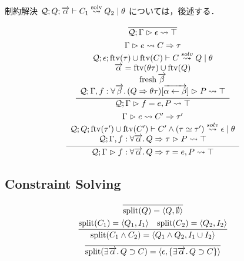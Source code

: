 制約解決 $\mathcal{Q}; Q; \overrightarrow{\alpha} \vdash C_1 \overset{\mathrm{solv}}{\rightsquigarrow} Q_2 \mid \theta$ については，後述する．

\begin{gather*}
  \infer{\mathcal{Q}; \Gamma \vrhd \epsilon \elab \top}{}
  \\
  \infer{\mathcal{Q}; \Gamma \vrhd f = e, P \elab \top}{
    \begin{array}{c}
      \Gamma \vrhd e \elab C \Rightarrow \tau \\
      \mathcal{Q}; \epsilon; \mathrm{ftv}(\tau) \cup \mathrm{ftv}(C) \vdash C \overset{solv}{\elab} Q \mid \theta \\
      \overrightarrow{\alpha} = \mathrm{ftv}(\theta\tau) \cup \mathrm{ftv}(Q) \\
      \symfresh \overrightarrow{\beta} \\
      \mathcal{Q}; \Gamma, f: \forall \overrightarrow{\beta}\ldotp (Q \Rightarrow \theta\tau)[\overrightarrow{\alpha \assign \beta}] \vrhd P \elab \top
    \end{array}
  }
  \\
  \infer{\mathcal{Q}; \Gamma \vrhd f: \forall \overrightarrow{\alpha}\ldotp Q \Rightarrow \tau = e, P \elab \top}{
    \begin{array}{c}
      \Gamma \vrhd e \elab C' \Rightarrow \tau' \\
      \mathcal{Q}; Q; \mathrm{ftv}(\tau') \cup \mathrm{ftv}(C') \vdash C' \land (\tau \simeq \tau') \overset{solv}{\elab} \epsilon \mid \theta \\
      \mathcal{Q}; \Gamma, f: \forall \overrightarrow{\alpha}\ldotp Q \Rightarrow \tau \vrhd P \elab \top
    \end{array}
  }
\end{gather*}

\subsection{Constraint Solving}

\begin{gather*}
  \infer{\mathrm{split}(Q) = \langle Q, \emptyset\rangle}{}
  \\
  \infer{\mathrm{split}(C_1 \land C_2) = \langle Q_1 \land Q_2, I_1 \cup I_2\rangle}{
    \mathrm{split}(C_1) = \langle Q_1, I_1\rangle
    &
    \mathrm{split}(C_2) = \langle Q_2, I_2\rangle
  }
  \\
  \infer{\mathrm{split}(\exists \overrightarrow{\alpha}\ldotp Q \supset C) = \langle \epsilon, \{\exists \overrightarrow{\alpha}\ldotp Q \supset C\}\rangle}{}
\end{gather*}


